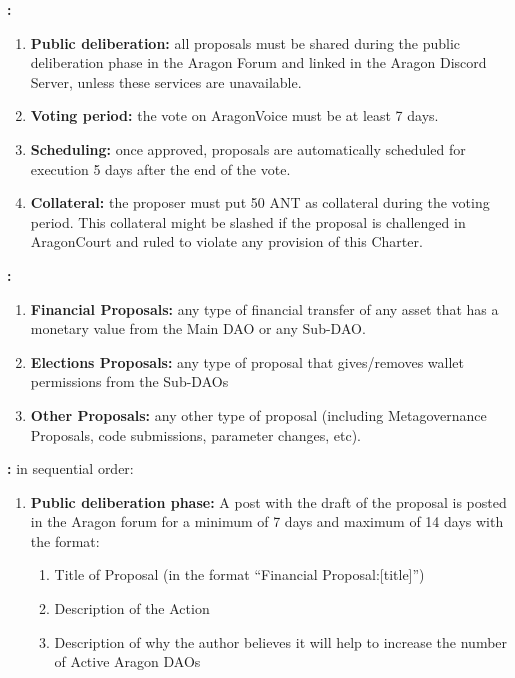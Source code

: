 \begin{enumerate}
\begin{enumerate}
		\textbf{:}
		\begin{enumerate}
			\item \textbf{Public deliberation:} all proposals must be shared during the public
			deliberation phase in the Aragon Forum and linked in the Aragon Discord
			Server, unless these services are unavailable.
			\item \textbf{Voting period:} the vote on \gls{AragonVoice} must be at least 7 days.
			\item \textbf{Scheduling:} once approved, proposals are automatically scheduled for
			execution 5 days after the end of the vote.
			\item \textbf{Collateral:} the proposer must put 50 \ac{ANT} as collateral during the voting
			period. This collateral might be slashed if the proposal is challenged in \gls{AragonCourt} and ruled to violate any provision of this Charter.
		\end{enumerate}
	
		\textbf{:}
		\begin{enumerate}
			\item \textbf{Financial Proposals:} any type of financial transfer of any asset that has
			a monetary value from the Main \ac{DAO} or any Sub-\ac{DAO}.
			\item \textbf{Elections Proposals:} any type of proposal that gives/removes wallet
			permissions from the Sub-\acp{DAO}
			\item \textbf{Other Proposals:} any other type of proposal (including Metagovernance
			Proposals, code submissions, parameter changes, etc).
		\end{enumerate}

		\textbf{:} in sequential order:
	
		\begin{enumerate}
			\item \textbf{Public deliberation phase:} A post with the draft of the proposal is posted in the Aragon forum for a minimum of 7 days and maximum of 14 days with the format:
			
			\begin{enumerate}
				\item Title of Proposal (in the format ``Financial Proposal:[title]'')
				\item Description of the Action
				\item Description of why the author believes it will help to increase the number of Active Aragon \acp{DAO}
				

\end{enumerate}
\end{enumerate}
\end{enumerate}
\end{enumerate}
